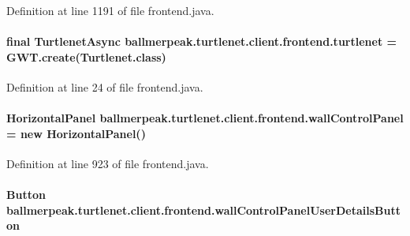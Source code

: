 Definition at line 1191 of file frontend.\-java.

\hypertarget{classballmerpeak_1_1turtlenet_1_1client_1_1frontend_aef6ce8b50c96dc1af6177f057c4b717f}{
\paragraph[{turtlenet}]{\setlength{\rightskip}{0pt plus 5cm}final {\bf Turtlenet\-Async} ballmerpeak.\-turtlenet.\-client.\-frontend.\-turtlenet = G\-W\-T.\-create(Turtlenet.\-class)\hspace{0.3cm}{\ttfamily [private]}}}\label{classballmerpeak_1_1turtlenet_1_1client_1_1frontend_aef6ce8b50c96dc1af6177f057c4b717f}


Definition at line 24 of file frontend.\-java.

\hypertarget{classballmerpeak_1_1turtlenet_1_1client_1_1frontend_a7ec1c30337c5278194425a4fa458996b}{
\paragraph[{wall\-Control\-Panel}]{\setlength{\rightskip}{0pt plus 5cm}Horizontal\-Panel ballmerpeak.\-turtlenet.\-client.\-frontend.\-wall\-Control\-Panel = new Horizontal\-Panel()\hspace{0.3cm}{\ttfamily [private]}}}\label{classballmerpeak_1_1turtlenet_1_1client_1_1frontend_a7ec1c30337c5278194425a4fa458996b}


Definition at line 923 of file frontend.\-java.

\hypertarget{classballmerpeak_1_1turtlenet_1_1client_1_1frontend_ae8e9ee35fb5626cbcdffeb1217d9b71e}{
\paragraph[{wall\-Control\-Panel\-User\-Details\-Button}]{\setlength{\rightskip}{0pt plus 5cm}Button ballmerpeak.\-turtlenet.\-client.\-frontend.\-wall\-Control\-Panel\-User\-Details\-Button\hspace{0.3cm}{\ttfamily [private]}}}\label{classballmerpeak_1_1turtlenet_1_1client_1_1frontend_ae8e9ee35fb5626cbcdffeb1217d9b71e}



